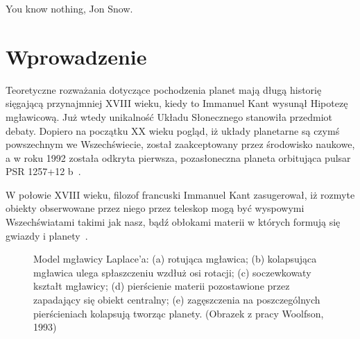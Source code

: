 \begin{savequote}[75mm]
   You know nothing, Jon Snow.
\end{savequote}

\chapter{Wprowadzenie}
Teoretyczne rozważania dotyczące pochodzenia planet mają długą historię
sięgającą przynajmniej XVIII wieku, kiedy to Immanuel Kant wysunął \dq{}Hipotezę
mgławicową\dq{}. Już wtedy unikalność Układu Słonecznego stanowiła przedmiot
debaty. Dopiero na początku XX wieku pogląd, iż układy planetarne są czymś
powszechnym we Wszechświecie, został zaakceptowany przez środowisko naukowe, a w
roku 1992 została odkryta pierwsza, pozasłoneczna planeta orbitująca pulsar PSR
1257+12 b~\cite{1992Natur.355..145W}.

W połowie XVIII wieku, filozof francuski Immanuel Kant zasugerował, iż rozmyte
o\-biek\-ty obserwowane przez niego przez teleskop mogą być wyspowymi
Wszechświatami takimi jak nasz, bądź obłokami materii w których formują się
gwiazdy i planety~\cite{ImmanuelKant.etal:2008}.

\begin{figure}[!ht]
\centering
\caption{Model mgławicy Laplace'a: (a) rotująca mgławica; (b) kolapsująca
mgławica ulega spłaszczeniu wzdłuż osi rotacji; (c) soczewkowaty kształt
mgławicy; (d) pierścienie materii pozostawione przez zapadający się obiekt
centralny; (e) zagęszczenia na poszczególnych pierścieniach kolapsują tworząc
planety. (Obrazek z pracy Woolfson, 1993)} 
\label{fig:laplace}
\end{figure}

